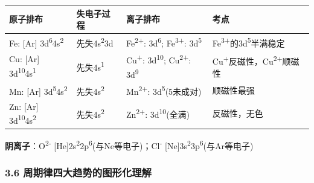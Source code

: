 \documentclass[a4paper,11pt]{ctexart}
\newcounter{none}
\newcommand{\箭}{\ensuremath{\rightarrow}}
\newcommand{\左箭}{\ensuremath{\leftarrow}}
\newcommand{\上箭}{\ensuremath{\uparrow}}
\newcommand{\下箭}{\ensuremath{\downarrow}}
\newcommand{\衡}{\ensuremath{\rightleftharpoons}}
\newcommand{\双箭}{\ensuremath{\leftrightarrow}}
\newcommand{\约等于}{\ensuremath{\approx}}
\newcommand{\小于等于}{\ensuremath{\leq}}
\newcommand{\大于等于}{\ensuremath{\geq}}
\newcommand{\不等于}{\ensuremath{\neq}}
\newcommand{\西格马}{\ensuremath{\sigma}}
\newcommand{\派}{\ensuremath{\pi}}
\begin{document}
{\def\LTcaptype{none} %
\begin{longtable}[]{@{}
  >{\raggedright\arraybackslash}p{}
  >{\raggedright\arraybackslash}p{}
  >{\raggedright\arraybackslash}p{}
  >{\raggedright\arraybackslash}p{}@{}}
\toprule\noalign{}
\begin{minipage}[b]{\linewidth}\raggedright
原子排布
\end{minipage} & \begin{minipage}[b]{\linewidth}\raggedright
失电子过程
\end{minipage} & \begin{minipage}[b]{\linewidth}\raggedright
离子排布
\end{minipage} & \begin{minipage}[b]{\linewidth}\raggedright
考点
\end{minipage} \\
\midrule\noalign{}
\endhead
\bottomrule\noalign{}
\endlastfoot
Fe: {[}Ar{]} 3d\textsuperscript{6}4s\textsuperscript{2} & 先失4s\textsuperscript{2}3d & Fe\textsuperscript{2+}: 3d\textsuperscript{6}; Fe\textsuperscript{3+}: 3d\textsuperscript{5} & Fe\textsuperscript{3+}的3d\textsuperscript{5}半满稳定 \\
Cu: {[}Ar{]} 3d\textsuperscript{10}4s\textsuperscript{1} & 先失4s\textsuperscript{1} & Cu\textsuperscript{+}: 3d\textsuperscript{10}; Cu\textsuperscript{2+}: 3d\textsuperscript{9} & Cu\textsuperscript{+}反磁性，Cu\textsuperscript{2+}顺磁性 \\
Mn: {[}Ar{]} 3d\textsuperscript{5}4s\textsuperscript{2} & 先失4s\textsuperscript{2} & Mn\textsuperscript{2+}: 3d\textsuperscript{5}(5未成对) & 顺磁性最强 \\
Zn: {[}Ar{]} 3d\textsuperscript{10}4s\textsuperscript{2} & 先失4s\textsuperscript{2} & Zn\textsuperscript{2+}: 3d\textsuperscript{10}(全满) & 反磁性，无色 \\
\end{longtable}
}

\textbf{阴离子}：O\textsuperscript{2-} {[}He{]}2s\textsuperscript{2}2p\textsuperscript{6}(与Ne等电子)；Cl\textsuperscript{-} {[}Ne{]}3s\textsuperscript{2}3p\textsuperscript{6}(与Ar等电子)

\subsubsection{3.6 周期律四大趋势的图形化理解}\label{ux5468ux671fux5f8bux56dbux5927ux8d8bux52bfux7684ux56feux5f62ux5316ux7406ux89e3}
\end{document}
